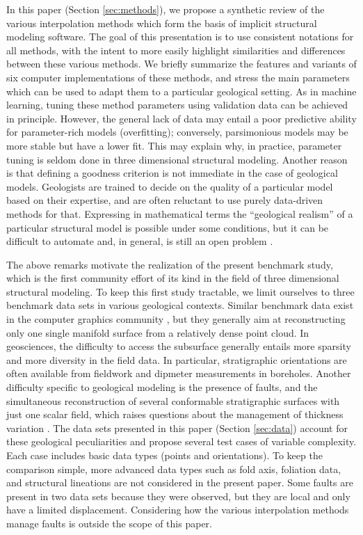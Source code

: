 \documentclass[preprint]{ring20}
\begin{document}
In this paper (Section \ref{sec:methods}), we propose a synthetic review of the various interpolation methods which form the basis of implicit structural modeling software. The goal of this presentation is to use consistent notations for all methods, with the intent to more easily highlight similarities and differences between these various methods. We briefly summarize the features and variants of six computer implementations of these methods, and stress the main parameters which can be used to adapt them to a particular geological setting. As in machine learning, tuning these method parameters using validation data can be achieved in principle. However, the general lack of data may entail a poor predictive ability for parameter-rich models (overfitting); conversely, parsimonious models may be more stable but have a lower fit. This may explain why, in practice, parameter tuning is seldom done in three dimensional structural modeling. Another reason is that defining a goodness criterion is not immediate in the case of geological models. Geologists are trained to decide on the quality of a particular model based on their expertise, and are often reluctant to use purely data-driven methods for that. Expressing in mathematical terms the ``geological realism'' of a particular structural model is possible under some conditions, but it can be difficult to automate and, in general, is still an open problem \citep{Caumon2010MG,Jessell2010T}. 

The above remarks motivate the realization of the present benchmark study, which is the first community effort of its kind in the field of three dimensional structural modeling. To keep this first study tractable, we limit ourselves to three benchmark data sets in various geological contexts. Similar benchmark data exist in the computer graphics community \citep[e.g.,][]{BLNTS13}, but they generally aim at reconstructing only one single manifold surface from a relatively dense point cloud. In geosciences, the difficulty to access the subsurface generally entails more sparsity and more diversity in the field data. In particular, stratigraphic orientations are often available from fieldwork and dipmeter measurements in boreholes. Another difficulty specific to geological modeling is the presence of faults, and the simultaneous reconstruction of several conformable stratigraphic surfaces with just one scalar field, which raises questions about the management of thickness variation \citep{Laurent2016MG}. The data sets presented in this paper (Section \ref{sec:data}) account for these geological peculiarities and propose several test cases of variable complexity. Each case includes basic data types (points and orientations). To keep the comparison simple, more advanced data types such as fold axis, foliation data, and structural lineations are not considered in the present paper. Some faults are present in two data sets because they were observed, but they are local and only have a limited displacement. Considering how the various interpolation methods manage faults is outside the scope of this paper. 
\end{document}
